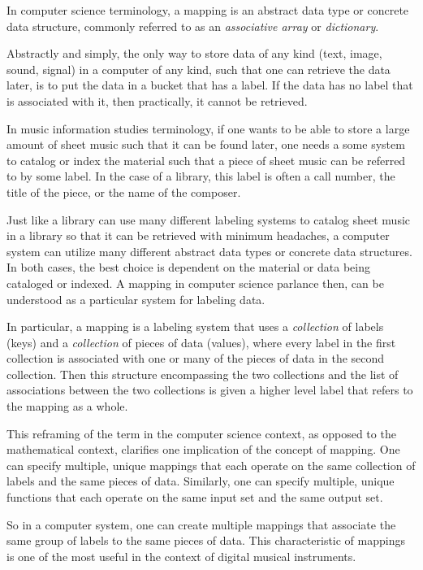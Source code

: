 In computer science terminology, a mapping is an abstract data type or concrete data structure, commonly referred to as an \emph{associative array} or \emph{dictionary}.  

Abstractly and simply, the only way to store data of any kind (text, image, sound, signal) in a computer of any kind, such that one can retrieve the data later, is to put the data in a bucket that has a label. If the data has no label that is associated with it, then practically, it cannot be retrieved. 

In music information studies terminology, if one wants to be able to store a large amount of sheet music such that it can be found later, one needs a some system to catalog or index the material such that a piece of sheet music can be referred to by some label. In the case of a library, this label is often a call number, the title of the piece, or the name of the composer.

Just like a library can use many different labeling systems to catalog sheet music in a library so that it can be retrieved with minimum headaches, a computer system can utilize many different abstract data types or concrete data structures. In both cases, the best choice is dependent on the material or data being cataloged or indexed. A mapping in computer science parlance then, can be understood as a particular system for labeling data.

In particular, a mapping is a labeling system that uses a \emph{collection} of labels (keys) and a \emph{collection} of pieces of data (values), where every label in the first collection is associated with one or many of the pieces of data in the second collection. Then this structure encompassing the two collections and the list of associations between the two collections is given a higher level label that refers to the mapping as a whole.

This reframing of the term in the computer science context, as opposed to the mathematical context, clarifies one implication of the concept of mapping. One can specify multiple, unique mappings that each operate on the same collection of labels and the same pieces of data. Similarly, one can specify multiple, unique functions that each operate on the same input set and the same output set. 

So in a computer system, one can create multiple mappings that associate the same group of labels to the same pieces of data. This characteristic of mappings is one of the most useful in the context of digital musical instruments. 

